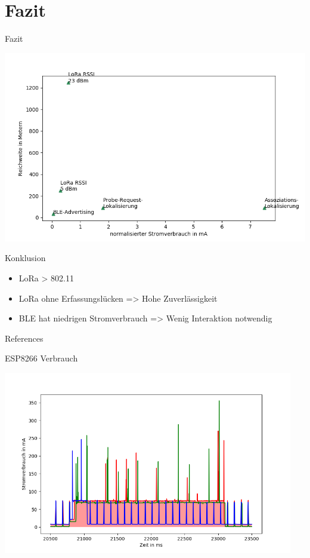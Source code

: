 \documentclass[18pt]{beamer}
\begin{document}
\section{Fazit}
\begin{frame}{Fazit}
	\begin{minipage}[t][0.45\textheight][t]{\textwidth}
		\centering
		\includegraphics[width=0.85\textheight]{plots/scatterplot.png}
	\end{minipage}


	\begin{block}{Konklusion}
			\begin{itemize}
				\item LoRa > 802.11
				\item LoRa ohne Erfassungslücken => Hohe Zuverlässigkeit
				\item BLE hat niedrigen Stromverbrauch => Wenig Interaktion notwendig
			\end{itemize}
	\end{block}

\end{frame}


\appendix
\beginbackup

\begin{frame}[allowframebreaks]{References}
\printbibliography
\end{frame}

\begin{frame}{ESP8266 Verbrauch}%
	\begin{minipage}[t][\textheight][t]{\textwidth}
		\centering
		\includegraphics[width=0.95\textwidth]{plots/wifillssendv2.png}
	\end{minipage}
\end{frame}
\end{document}
